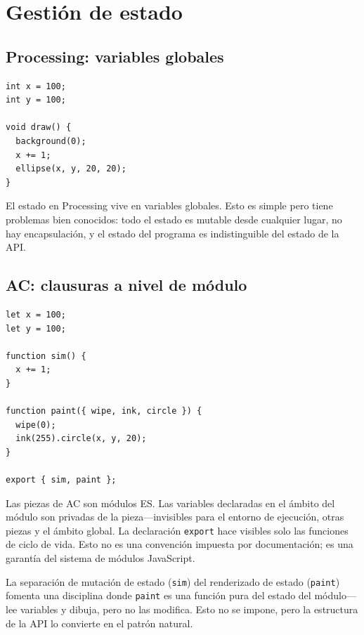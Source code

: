 \documentclass[10pt,letterpaper,twocolumn]{article}
\begin{document}

\section{Gestión de estado}
\label{sec:state}

\subsection{Processing: variables globales}

\begin{lstlisting}[style=processingstyle]
int x = 100;
int y = 100;

void draw() {
  background(0);
  x += 1;
  ellipse(x, y, 20, 20);
}
\end{lstlisting}

El estado en Processing vive en variables globales. Esto es simple pero tiene problemas bien conocidos: todo el estado es mutable desde cualquier lugar, no hay encapsulación, y el estado del programa es indistinguible del estado de la API.

\subsection{AC: clausuras a nivel de módulo}

\begin{lstlisting}[style=acjsstyle]
let x = 100;
let y = 100;

function sim() {
  x += 1;
}

function paint({ wipe, ink, circle }) {
  wipe(0);
  ink(255).circle(x, y, 20);
}

export { sim, paint };
\end{lstlisting}

Las piezas de AC son módulos ES. Las variables declaradas en el ámbito del módulo son privadas de la pieza---invisibles para el entorno de ejecución, otras piezas y el ámbito global. La declaración \texttt{export} hace visibles solo las funciones de ciclo de vida. Esto no es una convención impuesta por documentación; es una garantía del sistema de módulos JavaScript.

La separación de mutación de estado (\texttt{sim}) del renderizado de estado (\texttt{paint}) fomenta una disciplina donde \texttt{paint} es una función pura del estado del módulo---lee variables y dibuja, pero no las modifica. Esto no se impone, pero la estructura de la API lo convierte en el patrón natural.
\end{document}
